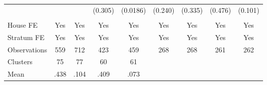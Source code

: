 {\begin{tabular}{l*{8}{c}}
                &         &         &  (0.305)& (0.0186)&  (0.240)&  (0.335)&  (0.476)&  (0.101)\\
                &         &         &         &         &         &         &         &         \\
House FE        &      Yes&      Yes&      Yes&      Yes&      Yes&      Yes&      Yes&      Yes\\
Stratum FE      &      Yes&      Yes&      Yes&      Yes&      Yes&      Yes&      Yes&      Yes\\
\midrule
Observations    &      559&      712&      423&      459&      268&      268&      261&      262\\
Clusters        &       75&       77&       60&       61&         &         &         &         \\
Mean            &     .438&     .104&     .409&     .073&         &         &         &         \\
\bottomrule
\end{tabular}
}
